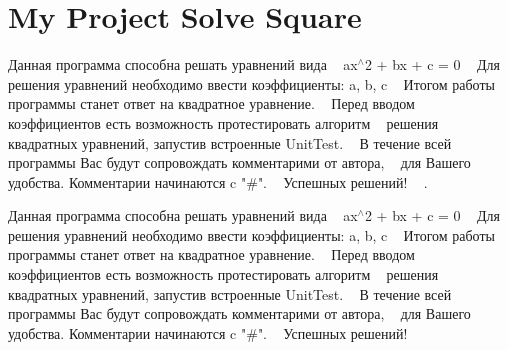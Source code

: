 \chapter{My Project Solve Square}
\hypertarget{index}{}\label{index}
Данная программа способна решать уравнений вида ~\newline
ax\texorpdfstring{$^\wedge$}{\string^}2 + bx + c = 0 ~\newline
Для решения уравнений необходимо ввести коэффициенты\+: a, b, c ~\newline
Итогом работы программы станет ответ на квадратное уравнение. ~\newline
Перед вводом коэффициентов есть возможность протестировать алгоритм ~\newline
решения квадратных уравнений, запустив встроенные Unit\+Test. ~\newline
В течение всей программы Вас будут сопровождать комментарими от автора, ~\newline
для Вашего удобства. Комментарии начинаются c "{}\#"{}. ~\newline
Успешных решений! ~\newline
.

Данная программа способна решать уравнений вида ~\newline
ax\texorpdfstring{$^\wedge$}{\string^}2 + bx + c = 0 ~\newline
Для решения уравнений необходимо ввести коэффициенты\+: a, b, c ~\newline
Итогом работы программы станет ответ на квадратное уравнение. ~\newline
Перед вводом коэффициентов есть возможность протестировать алгоритм ~\newline
решения квадратных уравнений, запустив встроенные Unit\+Test. ~\newline
В течение всей программы Вас будут сопровождать комментарими от автора, ~\newline
для Вашего удобства. Комментарии начинаются c "{}\#"{}. ~\newline
Успешных решений! ~\newline
   